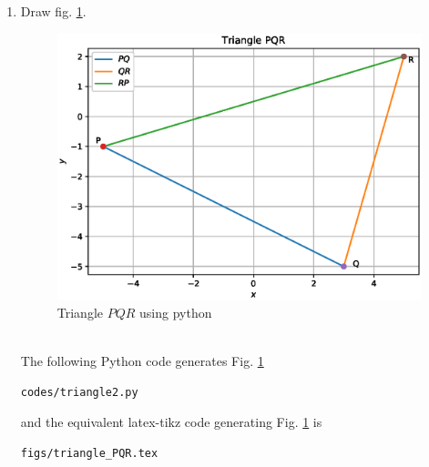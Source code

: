 \begin{enumerate}[label=\thesection.\arabic*.,ref=\thesection.\theenumi]
\begin{lstlisting}
codes/triangle1.py
\end{lstlisting}

and the equivalent latex-tikz code generating Fig. \ref{fig:triangle_1} is 
\begin{lstlisting}
figs/triangle_ABC.tex
\end{lstlisting}

\item Draw fig. \ref{fig:triangle_2}.
\begin{figure}[!ht]
\centering
\includegraphics[width=\columnwidth]{./codes/triangle2.eps}
\caption{Triangle $PQR$ using python}
\label{fig:triangle_2}
\end{figure} \\
\solution The  following Python code generates Fig. \ref{fig:triangle_2}

\begin{lstlisting}
codes/triangle2.py
\end{lstlisting}

and the equivalent latex-tikz code generating Fig. \ref{fig:triangle_2} is 
\begin{lstlisting}
figs/triangle_PQR.tex
\end{lstlisting}
 
%
\end{enumerate}
  

